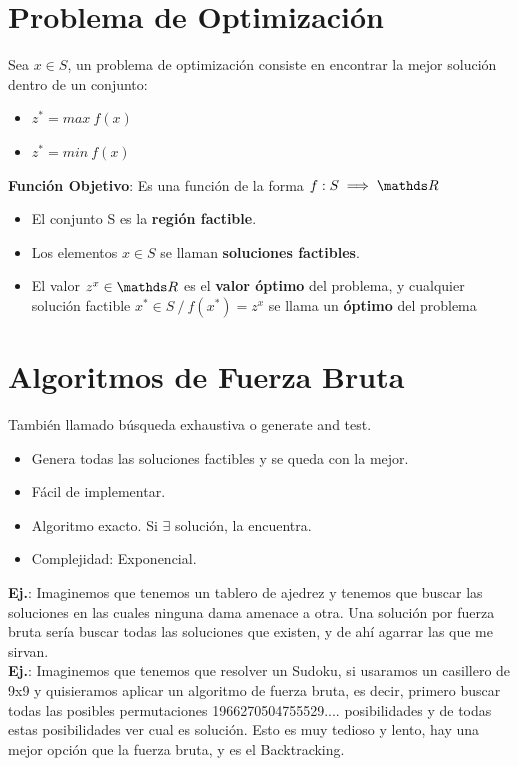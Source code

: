 \documentclass[10pt,a4paper]{article}
\begin{document}
\section*{Problema de Optimización}
Sea $x \in S$, un problema de optimización consiste en encontrar la mejor solución dentro de un conjunto: 
\begin{itemize}
    \item $z^{*} = max \ f(x)$
    \item $z^{*} = min \ f(x)$
\end{itemize}
\textbf{Función Objetivo}: Es una función de la forma $f:S\implies \float$
\begin{itemize}
    \item El conjunto S es la \textbf{región factible}.
    \item Los elementos $x \in S$ se llaman \textbf{soluciones factibles}.
    \item El valor $z^{x} \in \float$ es el \textbf{valor óptimo} del problema, y cualquier solución factible $x^{*} \in S \ / \ f(x^{*}) = z^{x}$ se llama un \textbf{óptimo} del problema
\end{itemize}
\section*{Algoritmos de Fuerza Bruta}
También llamado búsqueda exhaustiva o generate and test. 
\begin{itemize}
    \item Genera todas las soluciones factibles y se queda con la mejor.
    \item Fácil de implementar.
    \item Algoritmo exacto. Si $\exists$ solución, la encuentra.
    \item Complejidad: Exponencial.
\end{itemize}

\textbf{Ej.}: Imaginemos que tenemos un tablero de ajedrez y tenemos que buscar las soluciones en las cuales ninguna dama amenace a otra. Una solución por fuerza bruta sería buscar todas las soluciones que existen, y de ahí agarrar las que me sirvan. \\ 

\textbf{Ej.}: Imaginemos que tenemos que resolver un Sudoku, si usaramos un casillero de 9x9 y quisieramos aplicar un algoritmo de fuerza bruta, es decir, primero buscar todas las posibles permutaciones 1966270504755529.... posibilidades y de todas estas posibilidades ver cual es solución. Esto es muy tedioso y lento, hay una mejor opción que la fuerza bruta, y es el Backtracking.
\end{document}
